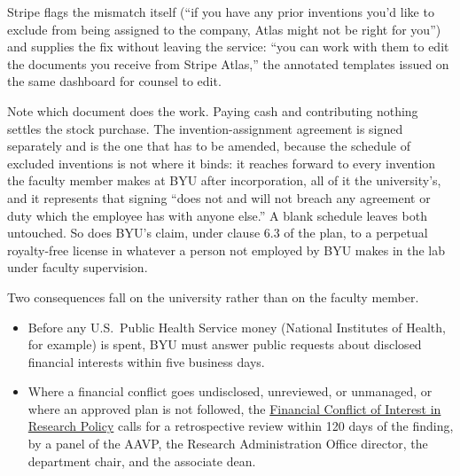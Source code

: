 \documentclass[11pt]{article}
\begin{document}
Stripe flags the mismatch itself (``if you have any prior inventions you'd
like to exclude from being assigned to the company, Atlas might not be right
for you'') and supplies the fix without leaving the service: ``you can work
with them to edit the documents you receive from Stripe Atlas,'' the annotated
templates issued on the same dashboard for counsel to edit.

Note which document does the work. Paying cash and contributing nothing
settles the stock purchase. The invention-assignment agreement is signed
separately and is the one that has to be amended, because the schedule of
excluded inventions is not where it binds: it reaches forward to every
invention the faculty member makes at BYU after incorporation, all of it the
university's, and it represents that signing ``does not and will not breach
any agreement or duty which the employee has with anyone else.'' A blank
schedule leaves both untouched. So does BYU's
claim, under clause 6.3 of the plan, to a perpetual royalty-free license in
whatever a person not employed by BYU makes in the lab under faculty
supervision.


Two consequences fall on the university rather than on the faculty member.

\begin{itemize}
\item Before any U.S.\ Public Health Service money (National Institutes of
Health, for example) is spent, BYU must answer public requests about disclosed
financial interests within five business days.
\item Where a financial conflict goes undisclosed, unreviewed, or unmanaged,
or where an approved plan is not followed, the
\href{https://policy.byu.edu/view/financial-conflict-of-interest-in-research-policy}{Financial
Conflict of Interest in Research Policy} calls for a retrospective review
within 120 days of the finding, by a panel of the AAVP, the Research
Administration Office director, the department chair, and the associate dean.
\end{itemize}

\end{document}
